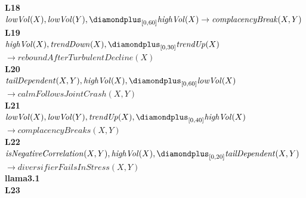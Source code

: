\begin{figure}[t]
{\begin{minipage}{0.95\textwidth}
\textbf{L18}\\
\hspace*{1.5em}\mbox{$\mathit{lowVol}(X), \mathit{lowVol}(Y), \diamondplus_{[0,60]} \mathit{highVol}(X) \to \mathit{complacencyBreak}(X,Y)$}\\[4pt]
\textbf{L19}\\
\hspace*{1.5em}\mbox{$\mathit{highVol}(X), \mathit{trendDown}(X), \diamondplus_{[0,30]} \mathit{trendUp}(X)$}\\
\hspace*{1.5em}\hspace*{3em}\mbox{$\to \mathit{reboundAfterTurbulentDecline}(X)$}\\[4pt]
\textbf{L20}\\
\hspace*{1.5em}\mbox{$\mathit{tailDependent}(X,Y), \mathit{highVol}(X), \diamondplus_{[0,60]} \mathit{lowVol}(X)$}\\
\hspace*{1.5em}\hspace*{3em}\mbox{$\to \mathit{calmFollowsJointCrash}(X,Y)$}\\[4pt]
\textbf{L21}\\
\hspace*{1.5em}\mbox{$\mathit{lowVol}(X), \mathit{lowVol}(Y), \mathit{trendUp}(X), \diamondplus_{[0,40]} \mathit{highVol}(X)$}\\
\hspace*{1.5em}\hspace*{3em}\mbox{$\to \mathit{complacencyBreaks}(X,Y)$}\\[4pt]
\textbf{L22}\\
\hspace*{1.5em}\mbox{$\mathit{isNegativeCorrelation}(X,Y), \mathit{highVol}(X), \diamondplus_{[0,20]} \mathit{tailDependent}(X,Y)$}\\
\hspace*{1.5em}\hspace*{3em}\mbox{$\to \mathit{diversifierFailsInStress}(X,Y)$}\\[8pt]
\textbf{llama3.1}\hspace{1em plus 1fill}{\footnotesize 5 runs, temperature 0.3}\\[2pt]
\textbf{L23}\\

\end{minipage}}
\end{figure}
